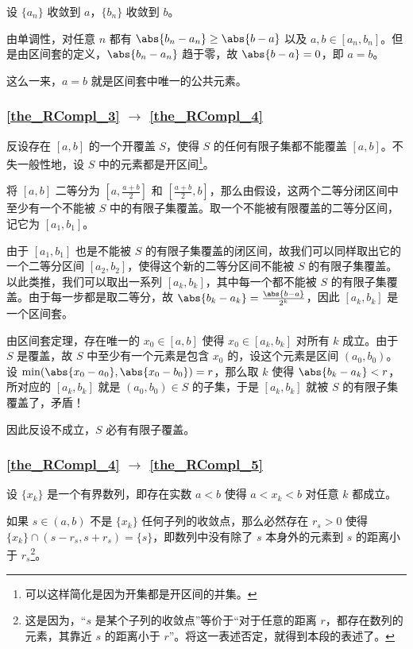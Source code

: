 设 $\{a_n\}$ 收敛到 $a$，$\{b_n\}$ 收敛到 $b$。

由单调性，对任意 $n$ 都有 $\abs{b_n-a_n}\geq\abs{b-a}$ 以及 $a, b\in [a_n, b_n]$。但是由区间套的定义，$\abs{b_n-a_n}$ 趋于零，故 $\abs{b-a}=0$，即 $a=b$。

这么一来，$a=b$ 就是区间套中唯一的公共元素。

\subsubsection{\autoref{the_RCompl_3} $\to$ \autoref{the_RCompl_4} }

反设存在 $[a, b]$ 的一个开覆盖 $S$，使得 $S$ 的任何有限子集都不能覆盖 $[a, b]$。不失一般性地，设 $S$ 中的元素都是开区间\footnote{可以这样简化是因为开集都是开区间的并集。}。

将 $[a, b]$ 二等分为 $[a, \frac{a+b}{2}]$ 和 $[\frac{a+b}{2}, b]$，那么由假设，这两个二等分闭区间中至少有一个不能被 $S$ 中的有限子集覆盖。取一个不能被有限覆盖的二等分区间，记它为 $[a_1, b_1]$。

由于 $[a_1, b_1]$ 也是不能被 $S$ 的有限子集覆盖的闭区间，故我们可以同样取出它的一个二等分区间 $[a_2, b_2]$，使得这个新的二等分区间不能被 $S$ 的有限子集覆盖。以此类推，我们可以取出一系列 $[a_k, b_k]$，其中每一个都不能被 $S$ 的有限子集覆盖。由于每一步都是取二等分，故 $\abs{b_k-a_k}=\frac{\abs{b-a}}{2^k}$，因此 $[a_k, b_k]$ 是一个区间套。

由区间套定理，存在唯一的 $x_0\in[a, b]$ 使得 $x_0\in[a_k, b_k]$ 对所有 $k$ 成立。由于 $S$ 是覆盖，故 $S$ 中至少有一个元素是包含 $x_0$ 的，设这个元素是区间 $(a_0, b_0)$。设 $\min(\abs{x_0-a_0}, \abs{x_0-b_0})=r$，那么取 $k$ 使得 $\abs{b_k-a_k}<r$，所对应的 $[a_k, b_k]$ 就是 $(a_0, b_0)\in S$ 的子集，于是 $[a_k, b_k]$ 就被 $S$ 的有限子集覆盖了，矛盾！

因此反设不成立，$S$ 必有有限子覆盖。

\subsubsection{\autoref{the_RCompl_4} $\to$ \autoref{the_RCompl_5} }

设 $\{x_k\}$ 是一个有界数列，即存在实数 $a<b$ 使得 $a<x_k<b$ 对任意 $k$ 都成立。

如果 $s\in(a, b)$ 不是 $\{x_k\}$ 任何子列的收敛点，那么必然存在 $r_s>0$ 使得 $\{x_k\}\cap (s-r_s, s+r_s)=\{s\}$，即数列中没有除了 $s$ 本身外的元素到 $s$ 的距离小于 $r_s$\footnote{这是因为，“$s$ 是某个子列的收敛点”等价于“对于任意的距离 $r$，都存在数列的元素，其靠近 $s$ 的距离小于 $r$”。将这一表述否定，就得到本段的表述了。}。

